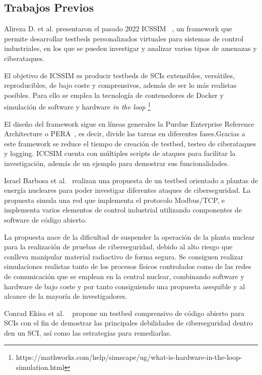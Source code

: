 \documentclass{article}
\begin{document}
\subsection{Trabajos Previos}

Alireza D. et al. presentaron el pasado 2022 ICSSIM~\cite{icssim} , un framework que permite desarrollar testbeds personalizados virtuales para sistemas de control industriales, en los que se pueden investigar y analizar varios tipos de amenazas y ciberataques.

El objetivo de ICSSIM es producir testbeds de SCIs extensibles, versátiles, reproducibles, de bajo coste y comprensivos, además de ser lo más realistas posibles. Para ello se emplea la tecnología de contenedores de Docker y simulación de software y hardware \textit{in the loop} \footnote{https://mathworks.com/help/simscape/ug/what-is-hardware-in-the-loop-simulation.html}

El diseño del framework sigue en líneas generales la Purdue Enterprise Reference Architecture o PERA~\cite{pera}, es decir, divide las tareas en diferentes fases.Gracias a este framework se reduce el tiempo de creación de testbed, testeo de ciberataques y logging. ICCSIM cuenta con múltiples scripts de ataques para facilitar la investigación, además de un ejemplo para demostrar sus funcionalidades.

Israel Barbosa et al.~\cite{nuclear} realizan una propuesta de un testbed orientado a plantas de energía nucleares para poder investigar diferentes ataques de ciberseguridad. La propuesta simula una red que implementa el protocolo Modbus/TCP, e implementa varios elementos de control industrial utilizando componentes de software de código abierto.

La propuesta nace de la dificultad de suspender la operación de la planta nuclear para la realización de pruebas de ciberseguridad, debido al alto riesgo que conlleva manipular material radiactivo de forma segura. Se consiguen realizar simulaciones realistas tanto de los procesos físicos controlados como de las redes de comunicación que se emplean en la central nuclear, combinando software y hardware de bajo coste y por tanto consiguiendo una propuesta asequible y al alcance de la mayoría de investigadores.

Conrad Ekisa et al. ~\cite{Ekisa2021} propone un testbed comprensivo de código abierto para SCIs con el fin de demostrar las principales debilidades de ciberseguridad dentro den un SCI, así como las estrategias para remediarlas.
\end{document}
